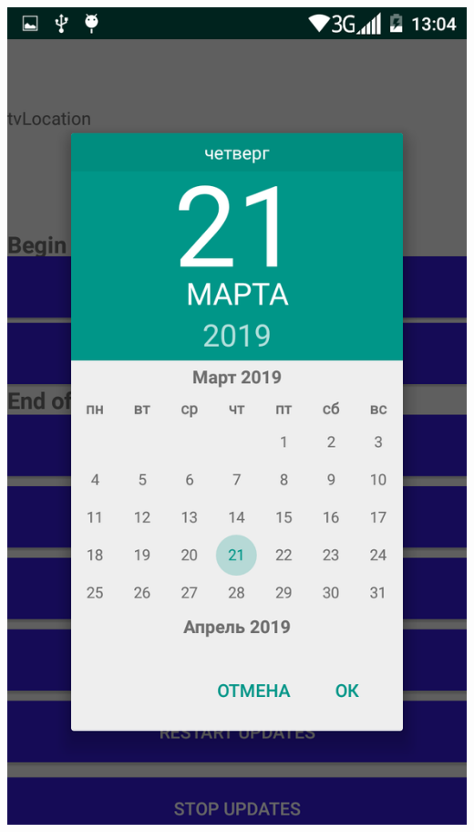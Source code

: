 \documentclass[hyperref={unicode}]{beamer}
\begin{document}
\begin{frame}
\begin{center}
	\includegraphics[height=0.8\textheight]{images/Screen_time2.png}
\end{center}

\end{frame}
\end{document}
